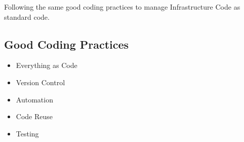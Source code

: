 \begin{definition}
Following the same good coding practices to manage Infrastructure Code as standard code.
\end{definition}

\subsection{Good Coding Practices}
\begin{itemize}
    \item Everything as Code
    \item Version Control %
    \item Automation
    \item Code Reuse
    \item Testing
\end{itemize}
